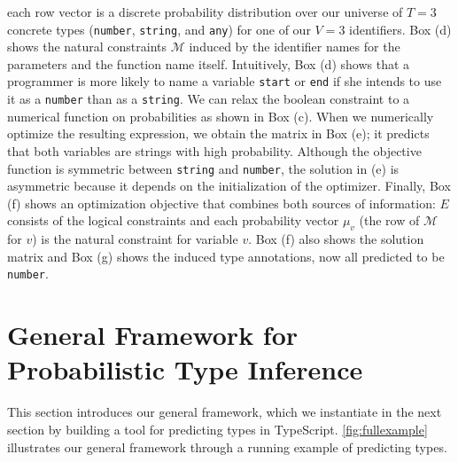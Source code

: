 \documentclass[sigplan,10pt,review,anonymous]{acmart} %
\theoremstyle{plain}
\theoremstyle{remark}
\theoremstyle{definition}
\begin{document}
\begin{figure*}
\begin{minipage}{\textwidth}
		each row vector is a discrete probability distribution
		over our universe of $T=3$ concrete types
		(\lstinline{number}, \lstinline{string}, and \lstinline{any})
		for one of our $V=3$ identifiers.
		Box (d) shows the natural constraints $\mathcal{M}$ induced by the identifier names
		for the parameters and the function name itself.
		Intuitively, Box (d) shows that a programmer
		is more likely to name a variable \lstinline{start} or \lstinline{end}
		if she intends to use it as a \lstinline{number} than as a \lstinline{string}.
		We can relax the boolean constraint
		to a numerical function on probabilities as shown in Box (c).
		When we numerically optimize the resulting expression,
		we obtain the matrix in Box (e);
		it predicts that both variables are strings with high probability.
		Although the objective function is symmetric
		between \lstinline{string} and \lstinline{number},
		the solution in (e) is asymmetric because it depends on the initialization
		of the optimizer.
		Finally, Box (f) shows an optimization objective that
		combines both sources of information:
		$E$ consists of the logical constraints
		and each probability vector $\mu_v$ (the row of $\mathcal{M}$ for $v$)
		is the natural constraint for variable $v$.
		Box (f) also shows the solution matrix and Box (g) shows the induced type annotations,
		now all predicted to be \lstinline{number}.
	\end{minipage}%
	\caption{An overview of the three type inference procedures via a minimal example.}\label{fig:fullexample}
\end{figure*}%
%
\section{General Framework for Probabilistic Type Inference} \label{sec:framework}
This section introduces our general framework,
which we instantiate in the next section by building a tool for
predicting types in TypeScript.
\cref{fig:fullexample} illustrates our general framework through a running example of predicting types. 

%
\end{document}

